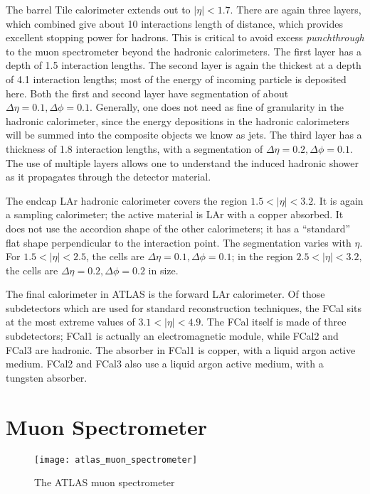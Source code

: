 The barrel Tile calorimeter extends out to $|\eta| < 1.7$.
There are again three layers, which combined give about 10 interactions length of distance, which provides excellent stopping power for hadrons.
This is critical to avoid excess \textit{punchthrough} to the muon spectrometer beyond the hadronic calorimeters.
The first layer has a depth of 1.5 interaction lengths.
The second layer is again the thickest at a depth of 4.1 interaction lengths; most of the energy of incoming particle is deposited here.
Both the first and second layer have segmentation of about $\Delta\eta = 0.1, \Delta\phi = 0.1$.
Generally, one does not need as fine of granularity in the hadronic calorimeter, since the energy depositions in the hadronic calorimeters will be summed into the composite objects we know as jets.
The third layer has a thickness of 1.8 interaction lengths, with a segmentation of $\Delta\eta = 0.2, \Delta\phi = 0.1$.
The use of multiple layers allows one to understand the induced hadronic shower as it propagates through the detector material.

The endcap LAr hadronic calorimeter covers the region $1.5 < |\eta| < 3.2$.
It is again a sampling calorimeter; the active material is LAr with a copper absorbed.
It does not use the accordion shape of the other calorimeters; it has a ``standard'' flat shape perpendicular to the interaction point.
The segmentation varies with $\eta$.
For $1.5 < |\eta| < 2.5 $, the cells are $\Delta\eta = 0.1, \Delta\phi = 0.1$; in the region $2.5 < |\eta | < 3.2$, the cells are $\Delta\eta = 0.2, \Delta\phi = 0.2$ in size.

The final calorimeter in ATLAS is the forward LAr calorimeter.
Of those subdetectors which are used for standard reconstruction techniques, the FCal sits at the most extreme values of $ 3.1 < |\eta| < 4.9$.
The FCal itself is made of three subdetectors; FCal1 is actually an electromagnetic module, while FCal2 and FCal3 are hadronic.
The absorber in FCal1 is copper, with a liquid argon active medium.
FCal2 and FCal3 also use a liquid argon active medium, with a tungsten absorber.

\section{Muon Spectrometer}
\begin{figure}
\caption{The ATLAS muon spectrometer} \label{fig:atlas_muon_spectrometer}
\texttt{[image: atlas\_muon\_spectrometer]}
\end{figure}

